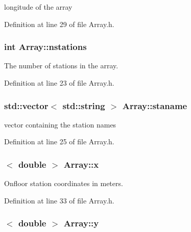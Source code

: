 longitude of the array 



Definition at line 29 of file Array.h.

\hypertarget{classArray_a972b05d3cedaf0c1997548c9dc573cd3}{
\subsubsection[{nstations}]{\setlength{\rightskip}{0pt plus 5cm}int {\bf Array::nstations}}}
\label{classArray_a972b05d3cedaf0c1997548c9dc573cd3}


The number of stations in the array. 



Definition at line 23 of file Array.h.

\hypertarget{classArray_a3b7da90274d9406db7fa04960594bb11}{
\subsubsection[{staname}]{\setlength{\rightskip}{0pt plus 5cm}std::vector$<$ std::string $>$ {\bf Array::staname}}}
\label{classArray_a3b7da90274d9406db7fa04960594bb11}


vector containing the station names 



Definition at line 25 of file Array.h.

\hypertarget{classArray_a378cb85324a4809cd3028668991044ae}{
\subsubsection[{x}]{$<$ double $>$ {\bf Array::x}}}
\label{classArray_a378cb85324a4809cd3028668991044ae}


Onfloor station coordinates in meters. 



Definition at line 33 of file Array.h.

\hypertarget{classArray_a2e59fb2a839ee2f10d5264e9624d9239}{
\subsubsection[{y}]{$<$ double $>$ {\bf Array::y}}}
\label{classArray_a2e59fb2a839ee2f10d5264e9624d9239}


